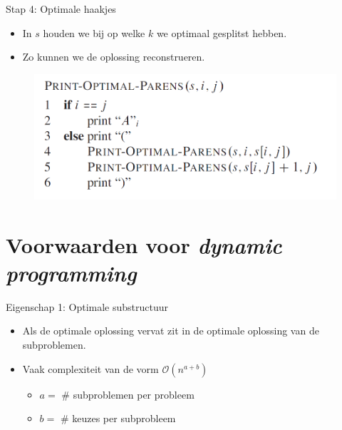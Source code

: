 \documentclass
   [kulak] %
   {kulakbeamer}
\begin{document}
\begin{frame}{Stap 4: Optimale haakjes}
\begin{itemize}
    \item In $s$ houden we bij op welke $k$ we optimaal gesplitst hebben.
    \item Zo kunnen we de oplossing reconstrueren.
\end{itemize}
\begin{figure}
    \centering
    \includegraphics[width=0.7\linewidth]{printsolutions.png}
\end{figure}
\end{frame}

\section{Voorwaarden voor \textit{dynamic programming}}
\begin{frame}{Eigenschap 1: Optimale substructuur}
\begin{itemize}
    \item<1-> Als de optimale oplossing vervat zit in de optimale oplossing van de subproblemen.
    \item<2-> Vaak complexiteit van de vorm $\mathcal{O}(n^{a + b})$
    \begin{itemize}
        \item<2-> $a = $ \# subproblemen per probleem
        \item<3-> $b = $ \# keuzes per subprobleem
    \end{itemize}
\end{itemize}
\end{frame}
\end{document}
